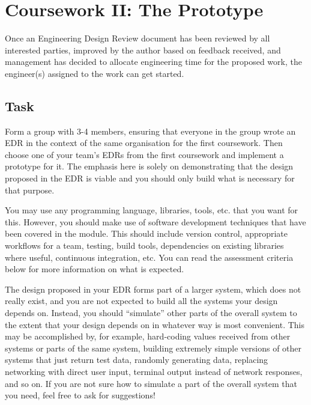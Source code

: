 
\clearpage
\section{Coursework II: The Prototype}

Once an Engineering Design Review document has been reviewed by all interested parties, improved by the author based on feedback received, and management has decided to allocate engineering time for the proposed work, the engineer(s) assigned to the work can get started.

\subsection{Task}

Form a group with 3-4 members, ensuring that everyone in the group wrote an EDR in the context of the same organisation for the first coursework. Then choose one of your team's EDRs from the first coursework and implement a prototype for it. The emphasis here is solely on demonstrating that the design proposed in the EDR is viable and you should only build what is necessary for that purpose.

You may use any programming language, libraries, tools, etc. that you want for this. However, you should make use of software development techniques that have been covered in the module. This should include version control, appropriate workflows for a team, testing, build tools, dependencies on existing libraries where useful, continuous integration, etc. You can read the assessment criteria below for more information on what is expected.

The design proposed in your EDR forms part of a larger system, which does not really exist, and you are not expected to build all the systems your design depends on. Instead, you should ``simulate'' other parts of the overall system to the extent that your design depends on in whatever way is most convenient. This may be accomplished by, for example, hard-coding values received from other systems or parts of the same system, building extremely simple versions of other systems that just return test data, randomly generating data, replacing networking with direct user input, terminal output instead of network responses, and so on. If you are not sure how to simulate a part of the overall system that you need, feel free to ask for suggestions!

